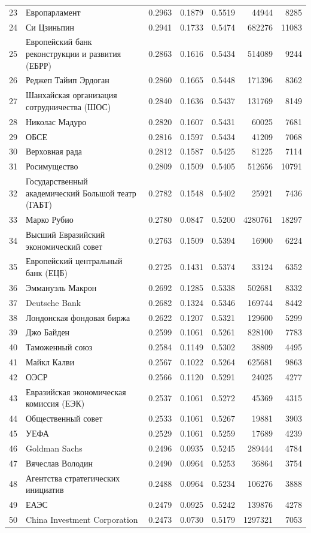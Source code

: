{\begin{longtable}{r >{\raggedright\arraybackslash}p{4.2cm} S[table-format=1.4] S[table-format=1.4] S[table-format=1.4] r r}
23 & Европарламент & 0.2963 & 0.1879 & 0.5519 & 44944 & 8285 \\
24 & Си Цзиньпин & 0.2941 & 0.1733 & 0.5474 & 682276 & 11083 \\
25 & Европейский банк реконструкции и развития (ЕБРР) & 0.2863 & 0.1616 & 0.5434 & 514089 & 9244 \\
26 & Реджеп Тайип Эрдоган & 0.2860 & 0.1665 & 0.5448 & 171396 & 8362 \\
27 & Шанхайская организация сотрудничества (ШОС) & 0.2840 & 0.1636 & 0.5437 & 131769 & 8149 \\
28 & Николас Мадуро & 0.2820 & 0.1607 & 0.5431 & 60025 & 7681 \\
29 & ОБСЕ & 0.2816 & 0.1597 & 0.5434 & 41209 & 7068 \\
30 & Верховная рада & 0.2812 & 0.1587 & 0.5425 & 81225 & 7114 \\
31 & Росимущество & 0.2809 & 0.1509 & 0.5405 & 512656 & 10791 \\
32 & Государственный академический Большой театр (ГАБТ) & 0.2782 & 0.1548 & 0.5402 & 25921 & 7436 \\
33 & Марко Рубио & 0.2780 & 0.0847 & 0.5200 & 4280761 & 18297 \\
34 & Высший Евразийский экономический совет & 0.2763 & 0.1509 & 0.5394 & 16900 & 6224 \\
35 & Европейский центральный банк (ЕЦБ) & 0.2725 & 0.1431 & 0.5374 & 33124 & 6352 \\
36 & Эммануэль Макрон & 0.2692 & 0.1285 & 0.5338 & 502681 & 8332 \\
37 & Deutsche Bank & 0.2682 & 0.1324 & 0.5346 & 169744 & 8442 \\
38 & Лондонская фондовая биржа & 0.2622 & 0.1207 & 0.5321 & 129600 & 5299 \\
39 & Джо Байден & 0.2599 & 0.1061 & 0.5261 & 828100 & 7783 \\
40 & Таможенный союз & 0.2584 & 0.1149 & 0.5302 & 38809 & 4495 \\
41 & Майкл Калви & 0.2567 & 0.1022 & 0.5264 & 625681 & 9863 \\
42 & ОЭСР & 0.2566 & 0.1120 & 0.5291 & 24025 & 4277 \\
43 & Евразийская экономическая комиссия (ЕЭК) & 0.2537 & 0.1061 & 0.5272 & 45369 & 4315 \\
44 & Общественный совет & 0.2533 & 0.1061 & 0.5267 & 19881 & 3903 \\
45 & УЕФА & 0.2529 & 0.1061 & 0.5259 & 17689 & 4239 \\
46 & Goldman Sachs & 0.2496 & 0.0935 & 0.5245 & 289444 & 4784 \\
47 & Вячеслав Володин & 0.2490 & 0.0964 & 0.5253 & 36864 & 3754 \\
48 & Агентства стратегических инициатив & 0.2488 & 0.0964 & 0.5234 & 106276 & 3888 \\
49 & ЕАЭС & 0.2479 & 0.0925 & 0.5242 & 139876 & 4278 \\
50 & China Investment Corporation & 0.2473 & 0.0730 & 0.5179 & 1297321 & 7053 \\
\end{longtable}
}

